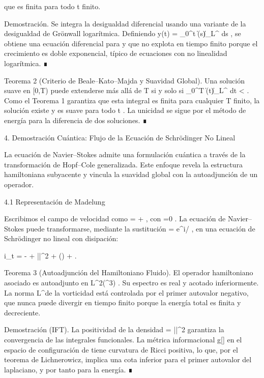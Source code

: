 \documentclass[12pt,a4paper]{book}
\begin{document}
que es finita para todo  t  finito.

Demostración. Se integra la desigualdad diferencial usando una variante de la desigualdad de Grönwall logarítmica. Definiendo  y(t) = \int_0^t \|\boldsymbol{\omega}(s)\|_{L^\infty} ds , se obtiene una ecuación diferencial para  y  que no explota en tiempo finito porque el crecimiento es doble exponencial, típico de ecuaciones con no linealidad logarítmica. ∎

Teorema 2 (Criterio de Beale–Kato–Majda y Suavidad Global).
Una solución suave en  [0,T)  puede extenderse más allá de  T  si y solo si  \int_0^T \|\boldsymbol{\omega}(t)\|_{L^\infty} dt < \infty . Como el Teorema 1 garantiza que esta integral es finita para cualquier  T  finito, la solución existe y es suave para todo  t  . La unicidad se sigue por el método de energía para la diferencia de dos soluciones. ∎

4. Demostración Cuántica: Flujo de la Ecuación de Schrödinger No Lineal

La ecuación de Navier–Stokes admite una formulación cuántica a través de la transformación de Hopf–Cole generalizada. Este enfoque revela la estructura hamiltoniana subyacente y vincula la suavidad global con la autoadjunción de un operador.

4.1 Representación de Madelung

Escribimos el campo de velocidad como   = \nabla \phi +  , con  \nabla\cdot{}=0 . La ecuación de Navier–Stokes puede transformarse, mediante la sustitución  \psi = \sqrt{\rho} e^{i\phi/\nu} , en una ecuación de Schrödinger no lineal con disipación:

i\nu \partial_t \psi = - \Delta \psi +  ||^2 \psi +  (\nabla\cdot{}) \psi + .

Teorema 3 (Autoadjunción del Hamiltoniano Fluido).
El operador hamiltoniano asociado es autoadjunto en  L^2(^3) . Su espectro es real y acotado inferiormente. La norma  L^\infty  de la vorticidad está controlada por el primer autovalor negativo, que nunca puede divergir en tiempo finito porque la energía total es finita y decreciente.

Demostración (IFT). La positividad de la densidad  \rho = |\psi|^2  garantiza la convergencia de las integrales funcionales. La métrica informacional  g[\rho]  en el espacio de configuración de  \psi  tiene curvatura de Ricci positiva, lo que, por el teorema de Lichnerowicz, implica una cota inferior para el primer autovalor del laplaciano, y por tanto para la energía. ∎
\end{document}
